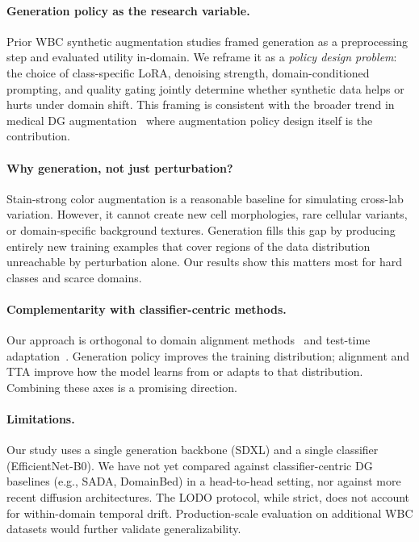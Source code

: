 \documentclass[10pt,twocolumn]{article}
\begin{document}
\paragraph{Generation policy as the research variable.}
Prior WBC synthetic augmentation studies framed generation as a
preprocessing step and evaluated utility in-domain. We reframe it as a
\emph{policy design problem}: the choice of class-specific LoRA,
denoising strength, domain-conditioned prompting, and quality gating
jointly determine whether synthetic data helps or hurts under domain
shift. This framing is consistent with the broader trend in medical DG
augmentation~\citep{su2022rethinkingdataaugmentationsinglesource} where
augmentation policy design itself is the contribution.

\paragraph{Why generation, not just perturbation?}
Stain-strong color augmentation is a reasonable baseline for simulating
cross-lab variation. However, it cannot create new cell morphologies,
rare cellular variants, or domain-specific background textures.
Generation fills this gap by producing entirely new training examples
that cover regions of the data distribution unreachable by perturbation
alone. Our results show this matters most for hard classes and scarce
domains.

\paragraph{Complementarity with classifier-centric methods.}
Our approach is orthogonal to domain alignment
methods~\citep{li2024stainawaredomainalignmentimbalance} and test-time
adaptation~\citep{Putzu_2025}. Generation policy improves the training
distribution; alignment and TTA improve how the model learns from or
adapts to that distribution. Combining these axes is a promising
direction.

\paragraph{Limitations.}
Our study uses a single generation backbone (SDXL) and a single
classifier (EfficientNet-B0). We have not yet compared against
classifier-centric DG baselines (e.g., SADA, DomainBed) in a
head-to-head setting, nor against more recent diffusion architectures.
The LODO protocol, while strict, does not account for within-domain
temporal drift. Production-scale evaluation on additional WBC datasets
would further validate generalizability.
\end{document}
